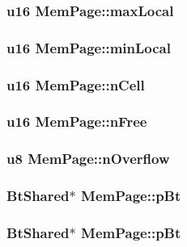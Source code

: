 \subsubsection{\setlength{\rightskip}{0pt plus 5cm}\bf{u16} \bf{Mem\-Page::max\-Local}}\label{structMemPage_2f2048c862314713e90039dc80aeb063}


\subsubsection{\setlength{\rightskip}{0pt plus 5cm}\bf{u16} \bf{Mem\-Page::min\-Local}}\label{structMemPage_9e563313fd6658ba97175063f67c109b}


\subsubsection{\setlength{\rightskip}{0pt plus 5cm}\bf{u16} \bf{Mem\-Page::n\-Cell}}\label{structMemPage_7c01157001cc715c2af0660a22ac00cf}


\subsubsection{\setlength{\rightskip}{0pt plus 5cm}\bf{u16} \bf{Mem\-Page::n\-Free}}\label{structMemPage_5ca08fe30d6a430a734339b7fe8e5383}


\subsubsection{\setlength{\rightskip}{0pt plus 5cm}\bf{u8} \bf{Mem\-Page::n\-Overflow}}\label{structMemPage_4bf66e4df03ea26b639cad151e264f15}


\subsubsection{\setlength{\rightskip}{0pt plus 5cm}\bf{Bt\-Shared}$\ast$ \bf{Mem\-Page::p\-Bt}}\label{structMemPage_735fd8a37d3f2fe611debcc82c8b444c}


\subsubsection{\setlength{\rightskip}{0pt plus 5cm}\bf{Bt\-Shared}$\ast$ \bf{Mem\-Page::p\-Bt}}\label{structMemPage_735fd8a37d3f2fe611debcc82c8b444c}


